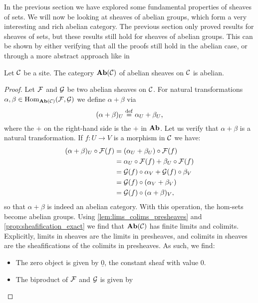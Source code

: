 \documentclass{article}
\begin{document}
In the previous section we have explored some
fundamental properties of sheaves of sets.
We will now be looking at sheaves of abelian groups,
which form a very interesting and rich abelian category.
The previous section only proved results for sheaves of
sets, but these results still hold for sheaves of abelian
groups. This can be shown by either verifying that all
the proofs still hold in the abelian case, or through
a more abstract approach like in
\cite[\href{https://stacks.math.columbia.edu/tag/00YR}{Section 00YR}]{stacks-project}
\begin{prop}
    Let $\mathcal{C}$ be a site. The category
    $\operatorname{\mathbf{Ab}}(\mathcal{C})$ of abelian sheaves on $\mathcal{C}$ is abelian.
\end{prop}
\begin{proof}
    Let $\mathcal{F}$ and $\mathcal{G}$ be two abelian sheaves on $\mathcal{C}$.
    For natural transformations $\alpha, \beta \in \operatorname{Hom}_{\operatorname{\mathbf{Ab}}(\mathcal{C})}(\mathcal{F}, \mathcal{G})$
    we define $\alpha + \beta$ via
    \begin{equation*}
        (\alpha + \beta)_U \overset{\mathrm{def}}{=} \alpha_U + \beta_U,
    \end{equation*}
    where the $+$ on the right-hand side is the $+$ in $\operatorname{\mathbf{Ab}}$.
    Let us verify that $\alpha + \beta$ is a natural transformation.
    If $f\colon U \to V$ is a morphism in $\mathcal{C}$ we have:
    \begin{align*}
        (\alpha + \beta)_U \circ \mathcal{F}(f)
         & = (\alpha_U + \beta_U) \circ \mathcal{F}(f)             \\
         & = \alpha_U \circ \mathcal{F}(f) + \beta_U \circ \mathcal{F}(f) \\
         & = \mathcal{G}(f) \circ \alpha_V + \mathcal{G}(f) \circ \beta_V \\
         & = \mathcal{G}(f) \circ (\alpha_V + \beta_V)             \\
         & = \mathcal{G}(f) \circ (\alpha + \beta)_V,
    \end{align*}
    so that $\alpha + \beta$ is indeed an abelian category.
    With this operation, the hom-sets become abelian groups.
    Using \cref{lem:lims_colims_presheaves} and \cref{prop:sheafification_exact}
    we find that $\operatorname{\mathbf{Ab}}(\mathcal{C})$ has finite limits and colimits.
    Explicitly, limits in sheaves are the limits in presheaves,
    and colimits in sheaves are the sheafifications of the colimits in presheaves.
    As such, we find:
    \begin{itemize}
        \item The zero object is given by $\underline{0}$,
              the constant sheaf with value $0$.
        \item The biproduct of $\mathcal{F}$ and $\mathcal{G}$ is given by

\end{itemize}
\end{proof}
\end{document}
